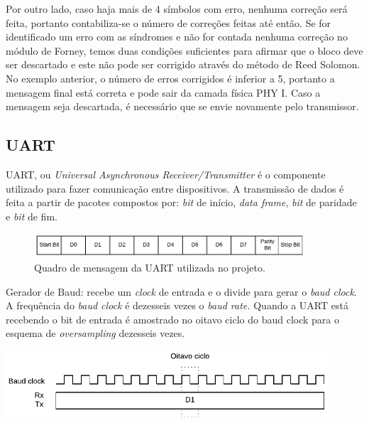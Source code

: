 	Por outro lado, caso haja mais de 4 símbolos com erro, nenhuma correção será feita, portanto contabiliza-se o número de correções feitas até então. Se for identificado um erro com as síndromes e não for contada nenhuma correção no módulo de Forney, temos duas condições suficientes para afirmar que o bloco deve ser descartado e este não pode ser corrigido através do método de Reed Solomon. No exemplo anterior, o número de erros corrigidos é inferior a 5, portanto a mensagem final está correta e pode sair da camada física PHY I. Caso a mensagem seja descartada, é necessário que se envie novamente pelo transmissor.	
	
	\subsection{UART}
	
	UART, ou \textit{Universal Asynchronous Receiver/Transmitter} é o componente utilizado para fazer comunicação entre dispositivos. A transmissão de dados é feita a partir de pacotes compostos por: \textit{bit} de início, \textit{data frame}, \textit{bit} de paridade e \textit{bit} de fim.
	\begin{figure}[h]
		\caption{\label{figure:uart-frame}Quadro de mensagem da UART utilizada no projeto.}
		\centering
		\includegraphics[width=0.9\textwidth]{uart/frame.pdf}
	\end{figure}
	
	Gerador de Baud: recebe um \textit{clock} de entrada e o divide para gerar o \textit{baud clock}. A frequência do \textit{baud clock} é dezesseis vezes o \textit{baud rate.} Quando a UART está recebendo o bit de entrada é amostrado no oitavo ciclo do baud clock para o esquema de \textit{oversampling} dezesseis vezes.
	
	\begin{chart}[h]
		\caption{\label{figure:uart-txrx}\textit{Oversampling} com \textit{baud clock}.}
		\centering
		\includegraphics[width=0.9\textwidth]{uart/txrx.pdf}
	\end{chart}
	
